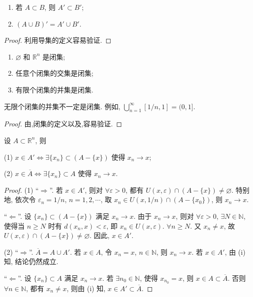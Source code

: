 \documentclass[../../main.tex]{subfiles}
\begin{document}
\begin{proposition}
\begin{enumerate}[(1)]
\item 若 $A \subset B$, 则 $A' \subset B'$;
\item $(A \cup B)' = A' \cup B'$.
\end{enumerate}
\end{proposition}
\begin{proof}
利用导集的定义容易验证.
\end{proof}

\begin{proposition}[闭集的性质]\label{proposition:闭集的性质}
\begin{enumerate}[(1)]
\item $\varnothing$ 和 $\mathbb{R}^n$ 是闭集;
\item 任意个闭集的交集是闭集;
\item 有限个闭集的并集是闭集.
\end{enumerate}
\end{proposition}
\begin{remark}
无限个闭集的并集不一定是闭集. 例如, $\bigcup_{n = 1}^{\infty} [1/n, 1] = (0, 1]$.
\end{remark}
\begin{proof}
由,闭集的定义以及,容易验证.
\end{proof}

\begin{proposition}\label{proposition:一个点在导集或闭包中的充要条件}
设 $A \subset \mathbb{R}^n$, 则

(1) $x \in A' \Leftrightarrow \exists \{x_n\} \subset (A - \{x\})$ 使得 $x_n \to x$;

(2) $x \in \overline{A} \Leftrightarrow \exists \{x_n\} \subset A$ 使得 $x_n \to x$.
\end{proposition}
\begin{proof}
(1) “$\Rightarrow$”. 若 $x \in A'$, 则对 $\forall \varepsilon > 0$, 都有 $U(x, \varepsilon) \cap (A - \{x\}) \neq \varnothing$. 特别地, 依次令 $\varepsilon_n = 1/n$, $n = 1, 2, \cdots$, 取 $x_n \in U(x, 1/n) \cap (A - \{x_0\})$, 则 $x_n \to x$.

“$\Leftarrow$”. 设 $\{x_n\} \subset (A - \{x\})$ 满足 $x_n \to x$. 由于 $x_n \to x$, 则对 $\forall \varepsilon > 0$, $\exists N \in \mathbb{N}$, 使得当 $n \geqslant N$ 时有 $d(x_n, x) < \varepsilon$, 即 $x_n \in U(x, \varepsilon)$. $\forall n \geqslant N$. 又 $x_n \neq x$, 故 $U(x, \varepsilon) \cap (A - \{x\}) \neq \varnothing$. 因此, $x \in A'$. 

(2) “$\Rightarrow$”. $\overline{A} = A \cup A'$. 若 $x \in A$, 令 $x_n = x$, $n \in \mathbb{N}$, 则 $x_n \to x$. 若 $x \in A'$, 由 (i) 知, 结论仍然成立.

“$\Leftarrow$”. 设 $\{x_n\} \subset A$ 满足 $x_n \to x$. 若 $\exists n_0 \in \mathbb{N}$, 使得 $x_{n_0} = x$, 则 $x \in A \subset \overline{A}$. 否则 $\forall n \in \mathbb{N}$, 都有 $x_n \neq x$, 则由 (i) 知, $x \in A' \subset \overline{A}$.
\end{proof}
\end{document}
